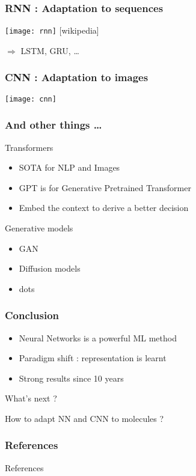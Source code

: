 \documentclass[11pt]{beamer}
\begin{document}
\begin{frame}
  \frametitle{RNN : Adaptation to sequences}
  \texttt{[image: rnn]}
                  {\footnotesize [wikipedia] }
                  
                  $\Rightarrow$ LSTM, GRU, \dots
\end{frame}

\begin{frame}
  \frametitle{CNN : Adaptation to images}
  \texttt{[image: cnn]}
\end{frame}


\begin{frame}
  \frametitle{And other things \dots}
  \begin{block}{Transformers}
    \begin{itemize}
    \item SOTA for NLP and Images
    \item GPT is for Generative Pretrained Transformer
    \item Embed the context to derive a better decision
    \end{itemize}
  \end{block}
  \begin{block}{Generative models}
    \begin{itemize}
    \item GAN
    \item Diffusion models
    \item dots
    \end{itemize}
  \end{block}
\end{frame}
\begin{frame}
  \frametitle{Conclusion}
  \begin{itemize}
  \item Neural Networks is a powerful ML method
  \item Paradigm shift : representation is learnt
  \item Strong results since 10 years
  \end{itemize}
  \begin{block}{What's next ?}
    \begin{center}
    {\Large How to adapt NN and CNN to molecules ? }
    \end{center}
  \end{block}

\end{frame}

\nocite{*}
\begin{frame}
  \frametitle{References}
    \begin{block}{References}
      
      
  \end{block}
\end{frame}
\end{document}
